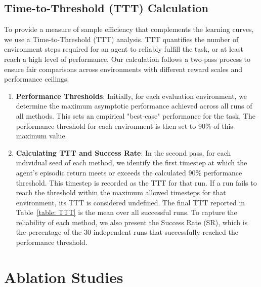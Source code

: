 \documentclass[letterpaper]{article}
\begin{document}
\begin{appendix}
\subsection{Time-to-Threshold (TTT) Calculation}
To provide a measure of sample efficiency that complements the learning curves, we use a Time-to-Threshold (TTT) analysis. TTT quantifies the number of environment steps required for an agent to reliably fulfill the task, or at least reach a high level of performance. Our calculation follows a two-pass process to ensure fair comparisons across environments with different reward scales and performance ceilings.
\begin{enumerate}
    \item \textbf{Performance Thresholds}: Initially, for each evaluation environment, we determine the maximum asymptotic performance achieved across all runs of all methods. This sets an empirical "best-case" performance for the task. The performance threshold for each environment is then set to 90\% of this maximum value.
    \item \textbf{Calculating TTT and Success Rate}: In the second pass, for each individual seed of each method, we identify the first timestep at which the agent's episodic return meets or exceeds the calculated 90\% performance threshold. This timestep is recorded as the TTT for that run. If a run fails to reach the threshold within the maximum allowed timesteps for that environment, its TTT is considered undefined. The final TTT reported in Table~\ref{table: TTT} is the mean over all successful runs. To capture the reliability of each method, we also present the Success Rate (SR), which is the percentage of the 30 independent runs that successfully reached the performance threshold.
\end{enumerate}
\onecolumn
\section{Ablation Studies}

\end{appendix}
\end{document}

